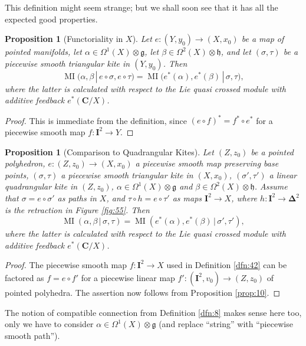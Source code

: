 \documentclass[10pt, a4paper]{amsart}
\newtheorem{prop}[equation]{Proposition}
\theoremstyle{definition}
\numberwithin{equation}{section}
\newcommand{\opn}{\operatorname}
\newcommand{\mfrak}[1]{\mathfrak{#1}}
\newcommand{\mbf}[1]{\mathbf{#1}}
\newcommand{\tup}[1]{\textup{#1}}
\newcommand{\bsym}[1]{\boldsymbol{#1}}
\renewcommand{\vert}{\, | \,}
\newcommand{\g}{\mfrak{g}}
\newcommand{\h}{\mfrak{h}}
\begin{document}
This definition might seem strange; but we shall soon see that it has all the
expected good properties.

\begin{prop}[Functoriality in $X$]
Let $e : (Y, y_0) \to (X, x_0)$ be a map of pointed manifolds, let
$\alpha \in \Omega^1(X) \otimes \g$, let
$\beta \in \Omega^2(X) \otimes \h$, 
and let $(\sigma, \tau)$ be a piecewise smooth triangular kite in $(Y, y_0)$.
Then
\[ \opn{MI}(\alpha, \beta \vert e \circ \sigma, e \circ \tau) = 
\opn{MI} \bigl( e^*(\alpha), e^*(\beta) \vert  \sigma, \tau \bigl) , \]
where the latter is calculated with respect to the Lie quasi crossed module
with additive feedback $e^*(\mbf{C} / X)$.
\end{prop}

\begin{proof}
This is immediate from the definition, since 
$(e \circ f)^* = f^* \circ e^*$ for a piecewise smooth map 
$f : \mbf{I}^2 \to Y$.
\end{proof}

\begin{prop}[Comparison to Quadrangular Kites] \label{prop:24}
Let $(Z, z_0)$ be a pointed polyhedron, 
$e : (Z, z_0) \to (X, x_0)$ a piecewise smooth map preserving base points, 
$(\sigma, \tau)$ a piecewise smooth triangular kite in $(X, x_0)$, 
$(\sigma', \tau')$ a  linear quadrangular kite in $(Z, z_0)$, 
$\alpha \in \Omega^1(X) \otimes \g$ and $\beta \in \Omega^2(X) \otimes \h$.
Assume that $\sigma = e \circ \sigma'$ as paths in $X$, and 
$\tau \circ h = e \circ \tau'$ as maps $\mbf{I}^2 \to X$, where
$h : \mbf{I}^2 \to \bsym{\Delta}^2$ is the retraction in
Figure \tup{\ref{fig:55}}.
Then
\[ \opn{MI}(\alpha, \beta \vert \sigma, \tau) =
\opn{MI}(e^*(\alpha), e^*(\beta) \vert \sigma', \tau') , \]
where the latter is calculated with respect to the Lie quasi crossed module
with additive feedback $e^*(\mbf{C} / X)$.
\end{prop}

\begin{proof}
The piecewise smooth map $f : \mbf{I}^2 \to X$ used in Definition \ref{dfn:42}
can be factored as $f = e \circ f'$ for a piecewise linear map 
$f' : (\mbf{I}^2, v_0) \to (Z, z_0)$ of pointed polyhedra.
The assertion now follows from Proposition \ref{prop:10}.
\end{proof}

The notion of compatible connection from Definition \ref{dfn:8} makes sense
here too, only we have to consider 
$\alpha \in \Omega^1(X) \otimes \g$
(and replace ``string'' with ``piecewise smooth path''). 
\end{document}
